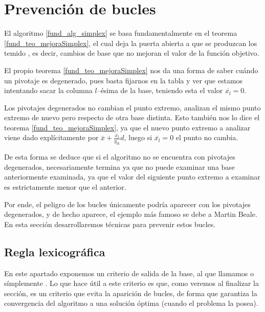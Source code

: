 \section{Prevención de bucles}
El algoritmo \ref{fund_alg_simplex} se basa fundamentalmente en el teorema \ref{fund_teo_mejoraSimplex}, el cual deja la puerta abierta a que se produzcan los temido , es decir, cambios de base que no mejoran el valor de la función objetivo.

El propio teorema \ref{fund_teo_mejoraSimplex} nos da una forma de saber cuándo un pivotaje es degenerado, pues basta fijarnos en la tabla y ver que estamos intentando sacar la columna $l$--ésima de la base, teniendo esta el valor $\overline{x_l}=0$.

Los pivotajes degenerados no cambian el punto extremo, analizan el mismo punto extremo de nuevo pero respecto de otra base distinta. Esto también nos lo dice el teorema \ref{fund_teo_mejoraSimplex}, ya que el nuevo punto extremo a analizar viene dado explícitamente por $\overline{x}+\frac{\overline{x_l}}{y_{lk}} d$, luego si $\overline{x_l}=0$ el punto no cambia.

De esta forma se deduce que si el algoritmo no se encuentra con pivotajes degenerados, necesariamente termina ya que no puede examinar una base anteriormente examinada, ya que el valor del siguiente punto extremo a examinar es estrictamente menor que el anterior.

Por ende, el peligro de los bucles únicamente podría aparecer con los pivotajes degenerados, y de hecho aparece, el ejemplo más famoso se debe a Martin Beale. En esta sección desarrollaremos técnicas para prevenir estos bucles.
\subsection{Regla lexicográfica}
En este apartado exponemos un criterio de salida de la base, al que llamamos  o símplemente . Lo que hace útil a este criterio es que, como veremos al finalizar la sección, es un criterio que evita la aparición de bucles, de forma que garantiza la convergencia del algoritmo a una solución óptima (cuando el problema la posea).

